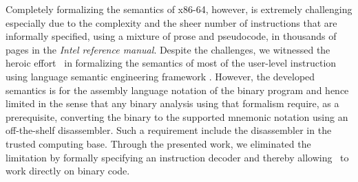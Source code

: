 \documentclass[a4paper,UKenglish,cleveref, autoref]{lipics-v2019}
\begin{document}
Completely formalizing the semantics of x86-64, however, is extremely challenging especially due to the complexity and the sheer number of instructions that are informally specified, using a mixture of prose and pseudocode, in thousands of pages in the \emph{Intel reference manual}. 
Despite the challenges, we witnessed the heroic effort~\cite{Dasgupta:2019} in formalizing the semantics of most of the user-level instruction using language semantic engineering framework \K. However, the developed semantics is for the assembly language notation of the binary program and hence limited in the sense that any binary analysis using that formalism require, as a prerequisite, converting the binary to the supported mnemonic notation using an off-the-shelf disassembler. Such a requirement include the disassembler in the trusted computing base. Through the presented work, we eliminated the limitation by formally specifying an instruction decoder and thereby allowing~\cite{Dasgupta:2019} to work directly on binary code.






\end{document}

